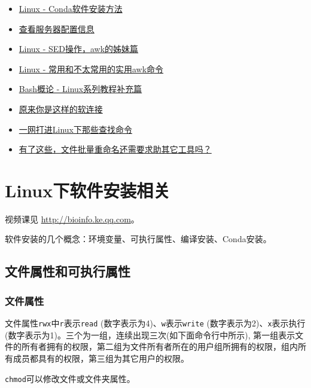 \documentclass[]{article}
\numberwithin{figure}{section}
\numberwithin{table}{section}
\begin{document}
\begin{itemize}
\item
  \href{http://mp.weixin.qq.com/s/A4_j8ZbyprMr1TT_wgisQQ}{Linux - Conda软件安装方法}
\item
  \href{http://mp.weixin.qq.com/s/xq0JfkHJJeHQk1acjOAJUQ}{查看服务器配置信息}
\item
  \href{http://mp.weixin.qq.com/s/cywkIeRbhkYTZvkwTeIVSA}{Linux - SED操作，awk的姊妹篇}
\item
  \href{http://mp.weixin.qq.com/s/8wD14FXt7fLDo1BjJyT0ew}{Linux - 常用和不太常用的实用awk命令}
\item
  \href{http://mp.weixin.qq.com/s/lWNp_6W_jLiogmtlk9nO2A}{Bash概论 - Linux系列教程补充篇}
\item
  \href{https://mp.weixin.qq.com/s/q3ic5WSfLdAnqIhFQX-bUQ}{原来你是这样的软连接}
\item
  \href{https://mp.weixin.qq.com/s/xWwj04h4W6yEqQLOfuQ8qA?}{一网打进Linux下那些查找命令}
\item
  \href{https://mp.weixin.qq.com/s/hyiGxm0jx6xEc90nHLN4dQ}{有了这些，文件批量重命名还需要求助其它工具吗？}
\end{itemize}

\hypertarget{softinstall}{%
\section{Linux下软件安装相关}\label{softinstall}}

视频课见 \url{http://bioinfo.ke.qq.com}。

软件安装的几个概念：环境变量、可执行属性、编译安装、Conda安装。

\hypertarget{fileattributeplusX}{%
\subsection{文件属性和可执行属性}\label{fileattributeplusX}}

\hypertarget{fileattribute}{%
\subsubsection{文件属性}\label{fileattribute}}

文件属性\texttt{rwx}中\texttt{r}表示\texttt{read} (数字表示为4)、\texttt{w}表示\texttt{write} (数字表示为2)、\texttt{x}表示执行 (数字表示为1)。三个为一组，连续出现三次(如下面命令行中所示), 第一组表示文件的所有者拥有的权限，第二组为文件所有者所在的用户组所拥有的权限，组内所有成员都具有的权限，第三组为其它用户的权限。

\texttt{chmod}可以修改文件或文件夹属性。
\end{document}

